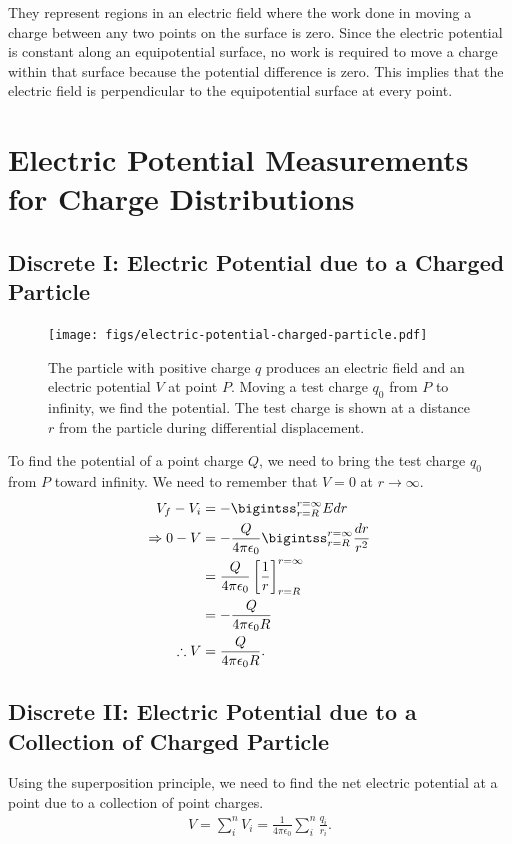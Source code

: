\documentclass[12pt,b4paper]{article}
\begin{document}
They represent regions in an electric field where the work done in moving a charge between any two points on the surface is zero. Since the electric potential is constant along an equipotential surface, no work is required to move a charge within that surface because the potential difference is zero. This implies that the electric field is perpendicular to the equipotential surface at every point.
 \section{Electric Potential Measurements for Charge Distributions}
\subsection{Discrete I: Electric Potential due to a Charged Particle}
\begin{figure}[H]
    \centering
    \texttt{[image: figs/electric-potential-charged-particle.pdf]}
    \caption{The particle with positive charge $q$ produces an electric field and an electric potential $V$ at point $P$. Moving a test charge $q_0$ from $P$ to infinity, we find the potential. The test charge is shown at a distance $r$ from the particle during differential displacement.}
    \label{fig:potential-point-charge}
\end{figure}
To find the potential of a point charge $Q$, we need to bring the test charge $q_0$ from $P$ toward infinity. We need to remember that $V=0$ at $r\to\infty$.
\begin{align}
    V_f-V_i&=-\bigintss_{{r=R}}^{{r=\infty}} Edr\notag\\
    \Rightarrow 0-V&=-\frac{Q}{4\pi\epsilon_0}\bigintss_{{r=R}}^{{r=\infty}} \frac{dr}{r^2}\notag\\
    &=\frac{Q}{4\pi\epsilon_0}\left[\frac{1}{r}\right]_{r=R}^{r=\infty} \notag\\
    &=-\frac{Q}{4\pi\epsilon_0R}\notag\\
    \therefore V&=\frac{Q}{4\pi\epsilon_0R}.
\end{align}
\subsection{Discrete II: Electric Potential due to a Collection of Charged Particle}
Using the superposition principle, we need to find the net electric potential at a point due to a collection of point charges.
\begin{align}
    V=\sum_i^nV_i=\frac{1}{4\pi\epsilon_0}\sum_i^n\frac{q_i}{r_i}.
\end{align}
\end{document}
